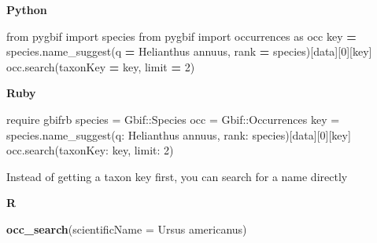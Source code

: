 \documentclass[3p]{elsarticle} %
\newenvironment{Shaded}{\begin{snugshade}}{\end{snugshade}}
\newcommand{\DataTypeTok}[1]{\textcolor[rgb]{0.13,0.29,0.53}{#1}}
\newcommand{\DecValTok}[1]{\textcolor[rgb]{0.00,0.00,0.81}{#1}}
\newcommand{\ImportTok}[1]{#1}
\newcommand{\KeywordTok}[1]{\textcolor[rgb]{0.13,0.29,0.53}{\textbf{#1}}}
\newcommand{\NormalTok}[1]{#1}
\newcommand{\OperatorTok}[1]{\textcolor[rgb]{0.81,0.36,0.00}{\textbf{#1}}}
\newcommand{\StringTok}[1]{\textcolor[rgb]{0.31,0.60,0.02}{#1}}
\begin{document}
\textbf{Python}

\begin{Shaded}
\begin{Highlighting}[]
\ImportTok{from}\NormalTok{ pygbif }\ImportTok{import}\NormalTok{ species}
\ImportTok{from}\NormalTok{ pygbif }\ImportTok{import}\NormalTok{ occurrences }\ImportTok{as}\NormalTok{ occ}
\NormalTok{key }\OperatorTok{=}\NormalTok{ species.name\_suggest(q }\OperatorTok{=} \StringTok{\textquotesingle{}Helianthus annuus\textquotesingle{}}\NormalTok{, rank }\OperatorTok{=} \StringTok{\textquotesingle{}species\textquotesingle{}}\NormalTok{)[}\StringTok{\textquotesingle{}data\textquotesingle{}}\NormalTok{][}\DecValTok{0}\NormalTok{][}\StringTok{\textquotesingle{}key\textquotesingle{}}\NormalTok{]}
\NormalTok{occ.search(taxonKey }\OperatorTok{=}\NormalTok{ key, limit }\OperatorTok{=} \DecValTok{2}\NormalTok{)}
\end{Highlighting}
\end{Shaded}

\textbf{Ruby}

\begin{Shaded}
\begin{Highlighting}[]
\NormalTok{require }\StringTok{\textquotesingle{}gbifrb\textquotesingle{}}
\NormalTok{species = }\DataTypeTok{Gbif}\NormalTok{::}\DataTypeTok{Species}
\NormalTok{occ = }\DataTypeTok{Gbif}\NormalTok{::}\DataTypeTok{Occurrences}
\NormalTok{key = species.name\_suggest(}\StringTok{q: \textquotesingle{}Helianthus annuus\textquotesingle{}}\NormalTok{, }\StringTok{rank: \textquotesingle{}species\textquotesingle{}}\NormalTok{)[}\StringTok{\textquotesingle{}data\textquotesingle{}}\NormalTok{][}\DecValTok{0}\NormalTok{][}\StringTok{\textquotesingle{}key\textquotesingle{}}\NormalTok{]}
\NormalTok{occ.search(}\StringTok{taxonKey: }\NormalTok{key, }\StringTok{limit: }\DecValTok{2}\NormalTok{)}
\end{Highlighting}
\end{Shaded}

Instead of getting a taxon key first, you can search for a name directly

\textbf{R}

\begin{Shaded}
\begin{Highlighting}[]
\KeywordTok{occ\_search}\NormalTok{(}\DataTypeTok{scientificName =} \StringTok{\textquotesingle{}Ursus americanus\textquotesingle{}}\NormalTok{)}
\end{Highlighting}
\end{Shaded}
\end{document}

